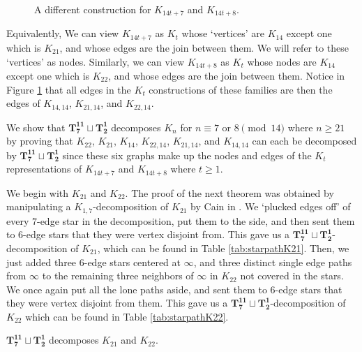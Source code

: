 \begin{figure}[H]
\begin{center}
    \end{center}
    \caption{A different construction for $K_{14t+7}$ and $K_{14t+8}$.}
    \label{fig:newconstrK21K22}
  \end{figure}
Equivalently, We can view $K_{14t+7}$ as $K_{t}$ whose `vertices' are $K_{14}$ except one which is $K_{21}$, and whose edges are the join between them. We will refer to these `vertices' as nodes. Similarly, we can view $K_{14t+8}$ as $K_{t}$ whose nodes are $K_{14}$ except one which is $K_{22}$, and whose edges are the join between them. Notice in Figure \ref{fig:newconstrK21K22} that all edges in the $K_{t}$ constructions of these families are then the edges of $K_{14,14}$, $K_{21,14}$, and $K_{22,14}$.

We show that $\mathbf{T_{7}^{11}}\sqcup\mathbf{T_{2}^{1}}$ decomposes $K_{n}$ for $n\equiv7 \textrm{ or }8\pmod{14}$ where $n\geq 21$ by proving that $K_{22}$, $K_{21}$, $K_{14}$, $K_{22,14}$, $K_{21,14}$, and $K_{14,14}$ can each be decomposed by $\mathbf{T_{7}^{11}}\sqcup\mathbf{T_{2}^{1}}$ since these six graphs make up the nodes and edges of the $K_{t}$ representations of $K_{14t+7}$ and $K_{14t+8}$ where $t\geq 1$.

We begin with $K_{21}$ and $K_{22}$. The proof of the next theorem was obtained by manipulating a $K_{1,7}$-decomposition of $K_{21}$ by Cain in \cite{Cain1974}. We `plucked edges off' of every $7$-edge star in the decomposition, put them to the side, and then sent them to $6$-edge stars that they were vertex disjoint from. This gave us a $\mathbf{T_{7}^{11}}\sqcup\mathbf{T_{2}^{1}}$-decomposition of $K_{21}$, which can be found in Table \ref{tab:starpathK21}. Then, we just added three $6$-edge stars centered at $\infty$, and three distinct single edge paths from $\infty$ to the remaining three neighbors of $\infty$ in $K_{22}$ not covered in the stars. We once again put all the lone paths aside, and sent them to $6$-edge stars that they were vertex disjoint from them. This gave us a $\mathbf{T_{7}^{11}}\sqcup\mathbf{T_{2}^{1}}$-decomposition of $K_{22}$ which can be found in Table \ref{tab:starpathK22}.
\begin{thm}\label{thm:PCstarpath}
    $\mathbf{T_{7}^{11}}\sqcup\mathbf{T_{2}^{1}}$ decomposes $K_{21}$ and $K_{22}$.
\end{thm}

